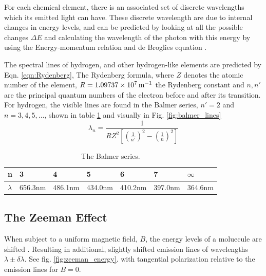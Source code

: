 \documentclass[11pt,a4paper]{article}
\begin{document}
      For each chemical element, there is an associated set of discrete wavelengths  which its emitted light can have. These discrete wavelength are due to internal changes in energy levels, and can be predicted by looking at all the possible changes $\Delta E$ and calculating the wavelength of the photon with this energy by using the Energy-momentum relation \cite{wiki:energy_momentum} and de Broglies equation \cite{wiki:debroglie}.

      The spectral lines of hydrogen, and other hydrogen-like elements are predicted by Eqn. \ref{eqn:Rydenberg}, The Rydenberg formula, where $Z$ denotes the atomic number of the element, $R=1.09737\times10^{7}\,\textup{m}^{-1}$ the Rydenberg constant and $n, n'$ are the principal quantum numbers of the electron before and after its transition. For hydrogen, the visible lines are found in the Balmer series, $n'=2$ and $n=3, 4, 5, \dots$, shown in table \ref{tab:balmerlines} and visually in Fig. \ref{fig:balmer_lines}
      \begin{equation}
         \lambda_n = \frac{1}{R Z^2 \left[ \left(\frac{1}{n'}\right)^2 - \left(\frac{1}{n}\right)^2 \right]} 
         \label{eqn:Rydenberg}
      \end{equation}

          \begin{table}[H]
        \center
        \caption{The Balmer series.}
         \begin{tabular}{l | l l l l l l}
          n       & 3 & 4 & 5 & 6 & 7 & $\infty$ \\ \hline
          $\lambda$ &  656.3nm & 486.1nm & 434.0nm & 410.2nm & 397.0nm & 364.6nm 
         \end{tabular}
         \label{tab:balmerlines}
    \end{table}




    \subsection{The Zeeman Effect}
      When subject to a uniform magnetic field, $B$, the energy levels of a moluecule are shifted \cite{griffiths}. Resulting in additional, slightly shifted emission lines of wavelengths $\lambda \pm \delta \lambda$. See fig. \ref{fig:zeeman_energy}. with tangential polarization relative to the emission lines for $B=0$.
\end{document}
